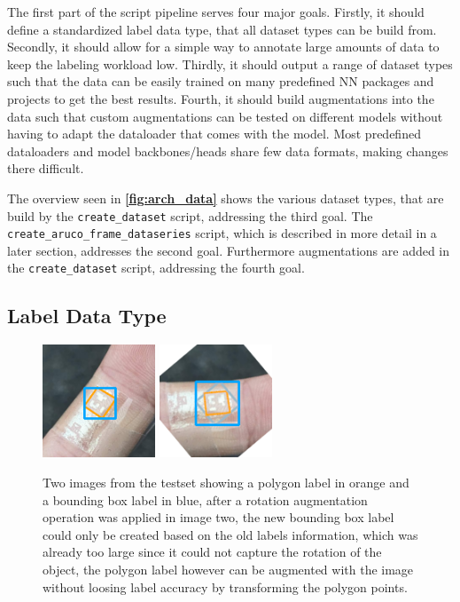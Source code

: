 \documentclass[10pt]{book}
\newcommand{\figureref}[1]{\textbf{\autoref{#1}}}
\begin{document}
The first part of the script pipeline serves four major goals. Firstly, it should define a standardized label data type, that all dataset types can be build from. Secondly, it should allow for a simple way to annotate large amounts of data to keep the labeling workload low. Thirdly, it should output a range of dataset types such that the data can be easily trained on many predefined \ac{NN} packages and projects to get the best results. Fourth, it should build augmentations into the data such that custom augmentations can be tested on different models without having to adapt the dataloader that comes with the model. Most predefined dataloaders and model backbones/heads share few data formats, making changes there difficult.

The overview seen in \figureref{fig:arch_data} shows the various dataset types, that are build by the \texttt{create\_dataset} script, addressing the third goal. The \texttt{create\_aruco\_frame\_dataseries} script, which is described in more detail in a later section, addresses the second goal. Furthermore augmentations are added in the \texttt{create\_dataset} script, addressing the fourth goal.

\subsection{Label Data Type}

\begin{figure}
  \centering
     {\includegraphics[width=0.3\textwidth]{image/polygon_pog_1}}
     {\includegraphics[width=0.3\textwidth]{image/polygon_pog_2}}
  \caption{Two images from the testset showing a polygon label in orange and a bounding box label in blue, after a rotation augmentation operation was applied in image two, the new bounding box label could only be created based on the old labels information, which was already too large since it could not capture the rotation of the object, the polygon label however can be augmented with the image without loosing label accuracy by transforming the polygon points.}
  \label{fig:polygon-good}
\end{figure}
\end{document}
